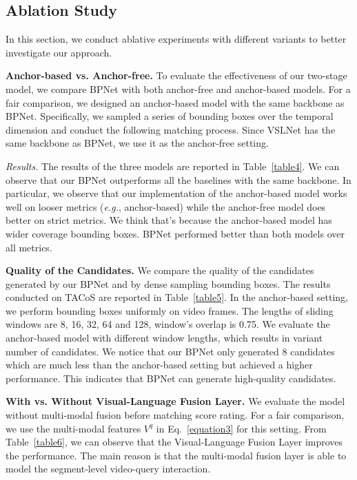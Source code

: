\documentclass[letterpaper]{article} %
\newcommand{\eg}{\emph{e.g.}}
\begin{document}
\subsection{Ablation Study}
\label{ablation}
In this section, we conduct ablative experiments with different
variants to better investigate our approach.

\noindent\textbf{Anchor-based vs. Anchor-free.}
To evaluate the effectiveness of our two-stage model,
we compare BPNet with both anchor-free and anchor-based models.
For a fair comparison, we designed an anchor-based model with the
same backbone as BPNet. Specifically, we sampled a series of
bounding boxes over the temporal dimension and conduct the following
matching process. Since VSLNet has the same backbone as
BPNet, we use it as the anchor-free setting.

\noindent\emph{Results.}
The results of the three models are reported in Table~\ref{table4}.
We can observe that our BPNet outperforms all the baselines with
the same backbone.
In particular, we observe that our implementation of the anchor-based
model works well on looser metrics (\eg, anchor-based)
while the anchor-free model does
better on strict metrics. We think that's because the anchor-based model has wider coverage bounding boxes.
BPNet performed better than both models over all metrics.

\noindent\textbf{Quality of the Candidates.}
We compare the quality of the candidates generated by our BPNet and
by dense sampling bounding boxes.
The results conducted on TACoS are reported in Table~\ref{table5}.
In the anchor-based setting, we perform bounding boxes uniformly on video frames.
The lengths of sliding windows are 8, 16, 32, 64 and 128, window's overlap is 0.75. We evaluate the anchor-based model with different window lengths, which results
in variant number of candidates.
We notice that our BPNet only generated 8 candidates which are much less than the
anchor-based setting but achieved a higher performance.
This indicates that BPNet can generate high-quality candidates.

\noindent\textbf{With vs. Without Visual-Language Fusion Layer.}
We evaluate the model without multi-modal fusion before matching score rating.
For a fair comparison, we use the multi-modal features $V^{q}$ in Eq.~\eqref{equation3} for
this setting.
From Table~\ref{table6}, we can observe that the Visual-Language Fusion Layer
improves the performance.
The main reason is that the multi-modal fusion layer is able to
model the segment-level video-query interaction.
\end{document}
